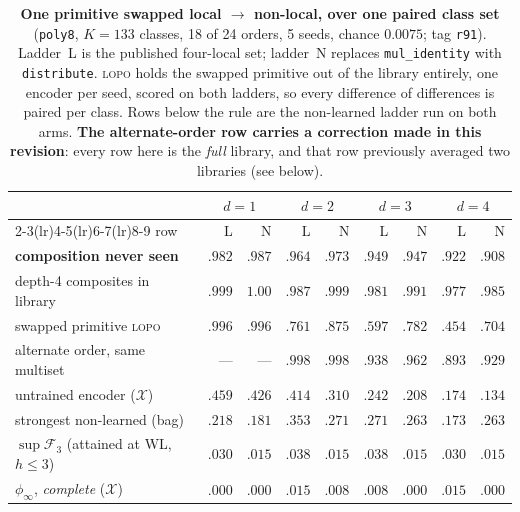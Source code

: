 \begin{table}[h]
\centering
\begin{threeparttable}
\footnotesize
\caption{\textbf{One primitive swapped local $\to$ non-local, over one paired class set} (\texttt{poly8}, $K{=}133$ classes, 18 of 24 orders, 5 seeds, chance $0.0075$; tag \texttt{r91}). Ladder~L is the published four-local set; ladder~N replaces \texttt{mul\_identity} with \texttt{distribute}. \textsc{lopo} holds the swapped primitive out of the library entirely, one encoder per seed, scored on both ladders, so every difference of differences is paired per class. Rows below the rule are the non-learned ladder run on both arms. \textbf{The alternate-order row carries a correction made in this revision}: every row here is the \emph{full} library, and that row previously averaged two libraries (see below).}
\label{tab:nonlocal_swap}
\small
\begin{tabular}{l rr rr rr rr}
\toprule
& \multicolumn{2}{c}{$d{=}1$} & \multicolumn{2}{c}{$d{=}2$} & \multicolumn{2}{c}{$d{=}3$} & \multicolumn{2}{c}{$d{=}4$} \\
\cmidrule(lr){2-3}\cmidrule(lr){4-5}\cmidrule(lr){6-7}\cmidrule(lr){8-9}
row & L & N & L & N & L & N & L & N \\
\midrule
\textbf{composition never seen} & $.982$ & $.987$ & $.964$ & $.973$ & $.949$ & $.947$ & $\mathbf{.922}$ & $\mathbf{.908}$ \\
depth-4 composites in library & $.999$ & $1.00$ & $.987$ & $.999$ & $.981$ & $.991$ & $.977$ & $.985$ \\
swapped primitive \textsc{lopo} & $.996$ & $.996$ & $.761$ & $.875$ & $.597$ & $.782$ & $.454$ & $.704$ \\
alternate order, same multiset & --- & --- & $.998$ & $.998$ & $.938$ & $.962$ & $.893$ & $.929$ \\
\midrule
untrained encoder \;($\mathcal{X}$) & $.459$ & $.426$ & $.414$ & $.310$ & $.242$ & $.208$ & $.174$ & $.134$ \\
strongest non-learned (bag) & $.218$ & $.181$ & $.353$ & $.271$ & $.271$ & $.263$ & $.173$ & $.263$ \\
$\sup\mathcal{F}_3$ (attained at WL, $h{\leq}3$) & $.030$ & $.015$ & $.038$ & $.015$ & $.038$ & $.015$ & $.030$ & $.015$ \\
$\phi_\infty$, \emph{complete} \;($\mathcal{X}$) & $.000$ & $.000$ & $.015$ & $.008$ & $.008$ & $.000$ & $.015$ & $.000$ \\
\bottomrule
\end{tabular}
\end{threeparttable}
\end{table}


